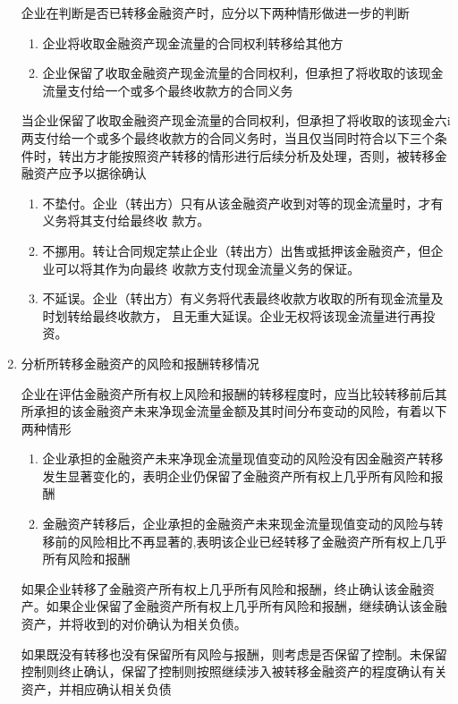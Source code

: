 \documentclass[UTF8,12pt]{ctexart}
\numberwithin{equation}{section} %
\numberwithin{figure}{section}
\numberwithin{table}{section}
\begin{document}
\begin{enumerate}
		企业在判断是否已转移金融资产时，应分以下两种情形做进一步的判断
		\begin{enumerate}
			\item 企业将收取金融资产现金流量的合同权利转移给其他方
			
			\item 企业保留了收取金融资产现金流量的合同权利，但承担了将收取的该现金流量支付给一个或多个最终收款方的合同义务
		\end{enumerate}
		
		当企业保留了收取金融资产现金流量的合同权利，但承担了将收取的该现金六i两支付给一个或多个最终收款方的合同义务时，当且仅当同时符合以下三个条件时，转出方才能按照资产转移的情形进行后续分析及处理，否则，被转移金融资产应予以据徐确认
		\begin{enumerate}
			\item 不垫付。企业（转出方）只有从该金融资产收到对等的现金流量时，才有义务将其支付给最终收
			款方。
			
			\item 不挪用。转让合同规定禁止企业（转出方）出售或抵押该金融资产，但企业可以将其作为向最终
			收款方支付现金流量义务的保证。
			
			\item 不延误。企业（转出方）有义务将代表最终收款方收取的所有现金流量及时划转给最终收款方，
			且无重大延误。企业无权将该现金流量进行再投资。
		\end{enumerate}
		
		\item 分析所转移金融资产的风险和报酬转移情况
		
		企业在评估金融资产所有权上风险和报酬的转移程度时，应当比较转移前后其所承担的该金融资产未来净现金流量金额及其时间分布变动的风险，有着以下两种情形
		\begin{enumerate}
			\item 企业承担的金融资产未来净现金流量现值变动的风险没有因金融资产转移发生显著变化的，表明企业仍保留了金融资产所有权上几乎所有风险和报酬
			
			\item 金融资产转移后，企业承担的金融资产未来现金流量现值变动的风险与转移前的风险相比不再显著的,表明该企业已经转移了金融资产所有权上几乎所有风险和报酬
		\end{enumerate}
	
		如果企业转移了金融资产所有权上几乎所有风险和报酬，终止确认该金融资产。如果企业保留了金融资产所有权上几乎所有风险和报酬，继续确认该金融资产，并将收到的对价确认为相关负债。
		
		如果既没有转移也没有保留所有风险与报酬，则考虑是否保留了控制。未保留控制则终止确认，保留了控制则按照继续涉入被转移金融资产的程度确认有关资产，并相应确认相关负债
		

\end{enumerate}
\end{document}
